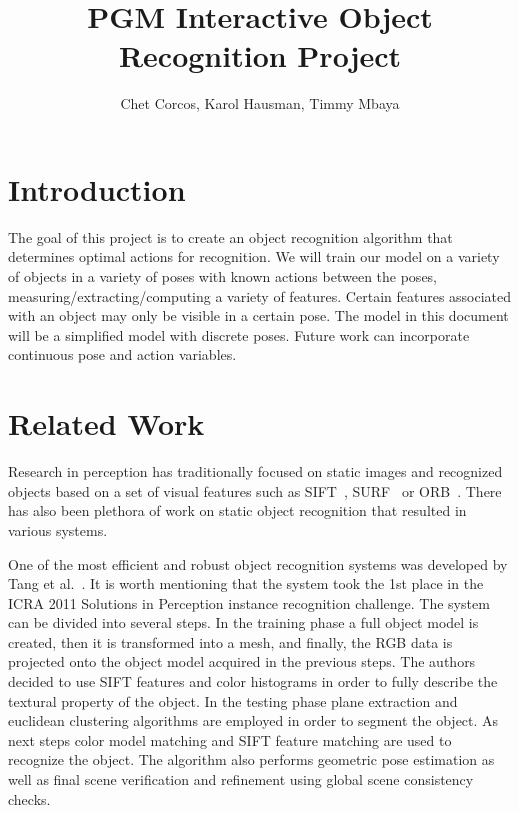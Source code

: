 \documentclass[11pt]{article}
\title{PGM Interactive Object Recognition Project}
\author{Chet Corcos, Karol Hausman, Timmy Mbaya }
\begin{document}
\maketitle
\tableofcontents

\newpage

\section{Introduction}

	The goal of this project is to create an object recognition algorithm that determines optimal actions for recognition. We will train our model on a variety of objects in a variety of poses with known actions between the poses, measuring/extracting/computing a variety of features. Certain features associated with an object may only be visible in a certain pose. The model in this document will be a simplified model with discrete poses. Future work can incorporate continuous pose and action variables.
\section{Related Work}

	Research in perception has traditionally focused on  static 
	images and recognized objects based on a set of visual features  such as SIFT~\cite{lowe2004distinctive}, SURF~\cite{bay2006surf} or ORB~\cite{rublee2011orb}.
	There has also been plethora of work on static object recognition that resulted in various systems.
	
	One of the most efficient and robust object recognition systems was developed by Tang et al.~\cite{tang2012textured}. It is worth mentioning that the system took the 1st place in the ICRA 2011 Solutions in Perception instance recognition challenge. The system can be divided into several steps. In the training phase a full object model is created, then it is transformed into a mesh, and finally, the RGB data is projected onto the object model acquired in the previous steps. The authors decided to use SIFT features and color histograms in order to fully describe the textural property of the object. In the testing phase plane extraction and euclidean clustering algorithms are employed in order to segment the object. As next steps color model matching and SIFT feature matching are used to recognize the object. The algorithm also performs geometric pose estimation as well as final scene verification and refinement using global scene consistency checks. 
\end{document}

